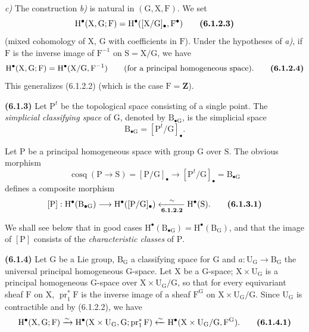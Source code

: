 \documentclass[11pt,leqno]{article}
\begin{document}
\textit{c)} The construction \textit{b)} is natural in \((\mathrm{G},\mathrm{X},\mathrm{F})\). We set
\[
\mathrm{H}^{\bullet}(\mathrm{X},\mathrm{G};\mathrm{F})
=\mathrm{H}^{\bullet}([\mathrm{X}/\mathrm{G}]_{\bullet},\mathrm{F}^{\bullet})
\tag*{\textbf{(6.1.2.3)}}
\]
(mixed cohomology of \(\mathrm{X}\), \(\mathrm{G}\) with coefficients in \(\mathrm{F}\)). Under the hypotheses of \textit{a)}, if \(\mathrm{F}\) is the inverse image of \(\mathrm{F}^{-1}\) on \(\mathrm{S}=\mathrm{X}/\mathrm{G}\), we have
\[
\mathrm{H}^{\bullet}(\mathrm{X},\mathrm{G};\mathrm{F})
=\mathrm{H}^{\bullet}(\mathrm{X}/\mathrm{G},\mathrm{F}^{-1})
\qquad\text{(for a principal homogeneous space).}
\tag*{\textbf{(6.1.2.4)}}
\]
This generalizes (6.1.2.2) (which is the case \(\mathrm{F}=\mathbf{Z}\)).

\textbf{(6.1.3)} Let \(\mathrm{P}^{t}\) be the topological space consisting of a single point. The \textit{simplicial classifying space} of \(\mathrm{G}\), denoted by \(\mathrm{B}_{\bullet\mathrm{G}}\), is the simplicial space
\[
\mathrm{B}_{\bullet\mathrm{G}}=[\mathrm{P}^{t}/\mathrm{G}]_{\bullet}.
\]

Let \(\mathrm{P}\) be a principal homogeneous space with group \(\mathrm{G}\) over \(\mathrm{S}\). The obvious morphism
\[
\operatorname{cosq}(\mathrm{P}\to\mathrm{S})
=[\mathrm{P}/\mathrm{G}]_{\bullet}
\to[\mathrm{P}^{t}/\mathrm{G}]_{\bullet}
=\mathrm{B}_{\bullet\mathrm{G}}
\]
defines a composite morphism
\[
[\mathrm{P}]:
\mathrm{H}^{\bullet}(\mathrm{B}_{\bullet\mathrm{G}})
\longrightarrow
\mathrm{H}^{\bullet}([\mathrm{P}/\mathrm{G}]_{\bullet})
\xleftarrow[\text{\textbf{6.1.2.2}}]{\sim}
\mathrm{H}^{\bullet}(\mathrm{S}).
\tag*{\textbf{(6.1.3.1)}}
\]

We shall see below that in good cases \(\mathrm{H}^{\bullet}(\mathrm{B}_{\bullet\mathrm{G}})=\mathrm{H}^{\bullet}(\mathrm{B}_{\mathrm{G}})\), and that the image of \([\mathrm{P}]\) consists of the \textit{characteristic classes} of \(\mathrm{P}\).

\textbf{(6.1.4)} Let \(\mathrm{G}\) be a Lie group, \(\mathrm{B}_{\mathrm{G}}\) a classifying space for \(\mathrm{G}\) and \(a:\mathrm{U}_{\mathrm{G}}\to\mathrm{B}_{\mathrm{G}}\) the universal principal homogeneous \(\mathrm{G}\)-space. Let \(\mathrm{X}\) be a \(\mathrm{G}\)-space; \(\mathrm{X}\times\mathrm{U}_{\mathrm{G}}\) is a principal homogeneous \(\mathrm{G}\)-space over \(\mathrm{X}\times\mathrm{U}_{\mathrm{G}}/\mathrm{G}\), so that for every equivariant sheaf \(\mathrm{F}\) on \(\mathrm{X}\), \(\operatorname{pr}_1^*\mathrm{F}\) is the inverse image of a sheaf \(\mathrm{F}^{\mathrm{G}}\) on \(\mathrm{X}\times\mathrm{U}_{\mathrm{G}}/\mathrm{G}\). Since \(\mathrm{U}_{\mathrm{G}}\) is contractible and by (6.1.2.2), we have
\[
\mathrm{H}^{\bullet}(\mathrm{X},\mathrm{G};\mathrm{F})
\xrightarrow{\sim}
\mathrm{H}^{\bullet}(\mathrm{X}\times\mathrm{U}_{\mathrm{G}},\mathrm{G};
\operatorname{pr}_1^*\mathrm{F})
\xleftarrow{\sim}
\mathrm{H}^{\bullet}(\mathrm{X}\times\mathrm{U}_{\mathrm{G}}/\mathrm{G},\mathrm{F}^{\mathrm{G}}).
\tag*{\textbf{(6.1.4.1)}}
\]
\end{document}
